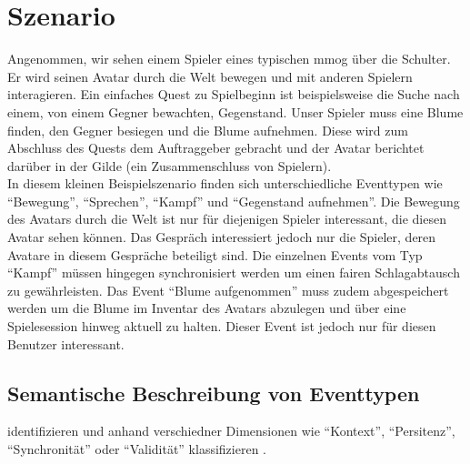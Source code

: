 \section{Szenario}
\label{chap:grundlagen:szenario}
Angenommen, wir sehen einem Spieler eines typischen \ac{mmog} über die Schulter. Er wird seinen Avatar durch die Welt bewegen und mit anderen Spielern interagieren. Ein einfaches Quest zu Spielbeginn ist beispielsweise die Suche nach einem, von einem Gegner bewachten, Gegenstand. Unser Spieler muss eine Blume finden, den Gegner besiegen und die Blume aufnehmen. Diese wird zum Abschluss des Quests dem Auftraggeber gebracht und der Avatar berichtet darüber in der Gilde (ein Zusammenschluss von Spielern).\\
In diesem kleinen Beispielszenario finden sich unterschiedliche Eventtypen wie \enquote{Bewegung}, \enquote{Sprechen}, \enquote{Kampf} und \enquote{Gegenstand aufnehmen}. Die Bewegung des Avatars durch die Welt ist nur für diejenigen Spieler interessant, die diesen Avatar sehen können. Das Gespräch interessiert jedoch nur die Spieler, deren Avatare in diesem Gespräche beteiligt sind. Die einzelnen Events vom Typ \enquote{Kampf} müssen hingegen synchronisiert werden um einen fairen Schlagabtausch zu gewährleisten. Das Event \enquote{Blume aufgenommen} muss zudem abgespeichert werden um die Blume im Inventar des Avatars abzulegen und über eine Spielesession hinweg aktuell zu halten. Dieser Event ist jedoch nur für diesen Benutzer interessant.

\subsection{Semantische Beschreibung von Eventtypen}


 identifizieren und anhand verschiedner Dimensionen wie ``Kontext'', ``Persitenz'', ``Synchronität'' oder ``Validität'' klassifizieren \cite{Fischer2010Event}.


